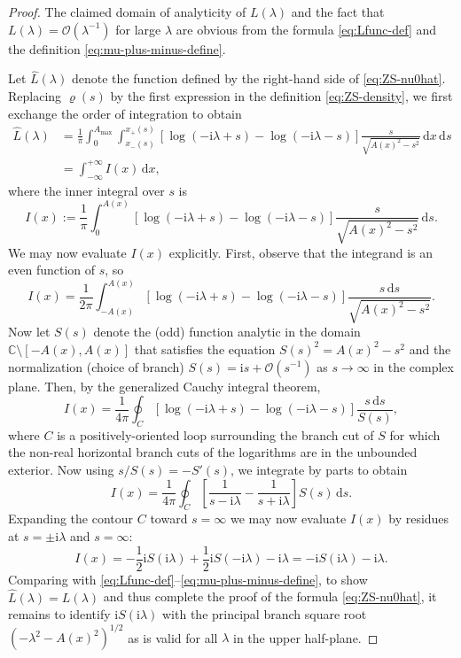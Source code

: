 \documentclass[12pt]{amsart}
\numberwithin{equation}{section}
\newcommand{\dd}{\mathrm{d}}
\newcommand{\ii}{\mathrm{i}}
\newcommand{\SP}{\lambda}
\newcommand{\evdensity}{\varrho}
\newcommand{\bigo}[1]{ \mathcal{O}\! \left( #1 \right) }
\begin{document}
\begin{proof}
The claimed domain of analyticity of $L(\SP)$ and the fact that $L(\SP)=\bigo{\SP^{-1}}$ for large $\SP$ are obvious from the formula \eqref{eq:Lfunc-def} and the definition \eqref{eq:mu-plus-minus-define}.  

Let $\hat{L}(\SP)$ denote the function defined by the right-hand side of \eqref{eq:ZS-nu0hat}.
Replacing $\evdensity(s)$ by the first expression in the definition \eqref{eq:ZS-density}, we first exchange the order of integration to obtain
\begin{equation}
\begin{split}
\hat{L}(\SP)&=\frac{1}{\pi}\int_0^{A_\mathrm{max}}\int_{x_-(s)}^{x_+(s)}\left[\log(-\ii\SP+s)-\log(-\ii\SP-s)\right]\frac{s}{\sqrt{A(x)^2-s^2}}\,\dd x\,\dd s\\
&=
\int_{-\infty}^{+\infty}I(x)\,\dd x,
\end{split}
\end{equation}
where the inner integral over $s$ is
\begin{equation}
I(x):=\frac{1}{\pi}\int_0^{A(x)}\left[\log(-\ii\SP+s)-\log(-\ii\SP-s)\right]
\frac{s}{\sqrt{A(x)^2-s^2}}\,\dd s.
\end{equation}
We may now evaluate $I(x)$ explicitly.  First, observe that the integrand is an even function of $s$, so
\begin{equation}
I(x)=\frac{1}{2\pi}\int_{-A(x)}^{A(x)}\left[\log(-\ii\SP+s)-\log(-\ii\SP-s)\right]\frac{s\,\dd s}{\sqrt{A(x)^2-s^2}}.
\end{equation}
Now let $S(s)$ denote the (odd) function analytic in the domain $\mathbb{C}\setminus [-A(x),A(x)]$ that satisfies the equation $S(s)^2=A(x)^2-s^2$ and the normalization (choice of branch) $S(s)=\ii s + \bigo{s^{-1}}$ as $s\to\infty$ in the complex plane.  Then, by the generalized Cauchy integral theorem,
\begin{equation}
I(x)=\frac{1}{4\pi}\oint_C\left[\log(-\ii\SP+s)-\log(-\ii\SP-s)\right]\frac{s\,\dd s}{S(s)},
\end{equation}
where $C$ is a positively-oriented loop surrounding the branch cut of $S$ for which the non-real horizontal branch cuts of the logarithms are in the unbounded exterior.  Now using $s/S(s)=-S'(s)$, we integrate by parts to obtain
\begin{equation}
I(x)=\frac{1}{4\pi}\oint_C\left[\frac{1}{s-\ii\SP}-\frac{1}{s+\ii\SP}\right]S(s)\,\dd s.
\end{equation}
Expanding the contour $C$ toward $s=\infty$ we may now evaluate $I(x)$ by residues at $s=\pm \ii\SP$ and $s=\infty$:
\begin{equation}
I(x)=-\frac{1}{2}\ii S(\ii\SP)+\frac{1}{2}\ii S(-\ii\SP)-\ii\SP = -\ii S(\ii\SP)-\ii\SP.
\end{equation}
Comparing with \eqref{eq:Lfunc-def}--\eqref{eq:mu-plus-minus-define}, to show $\hat{L}(\SP)=L(\SP)$ and thus complete the proof of the formula \eqref{eq:ZS-nu0hat}, it remains to identify $\ii S(\ii\SP)$ with the principal branch square root $(-\SP^2-A(x)^2)^{1/2}$ as is valid for all $\SP$ in the upper half-plane.


\end{proof}
\end{document}
